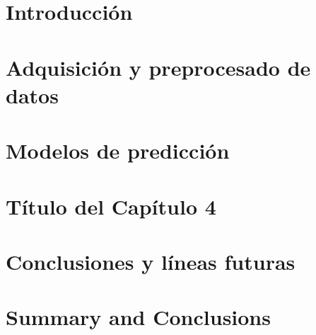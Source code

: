 \documentclass[spanish,a4paper,12pt,oneside]{extreport}
\begin{document}
\chapter{\LARGE Introducción}
\label{chapter:intro}



\newpage{\pagestyle{empty}}
\thispagestyle{empty}

\chapter{\LARGE Adquisición y preprocesado de datos}
\label{chapter:dos}



\newpage{\pagestyle{empty}}
\thispagestyle{empty}

\chapter{\LARGE Modelos de predicción}
\label{chapter:tres}



\newpage{\pagestyle{empty}}
\thispagestyle{empty}

\chapter{\LARGE Título del Capítulo 4}
\label{chapter:cuatro}



\newpage{\pagestyle{empty}}
\thispagestyle{empty}

\chapter{\LARGE Conclusiones y líneas futuras}
\label{chapter:Resultados}



\newpage{\pagestyle{empty}}
\thispagestyle{empty}

\chapter{\LARGE Summary and Conclusions}
\label{chapter:Conclusiones}
\end{document}
